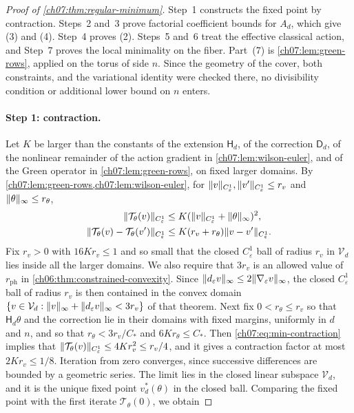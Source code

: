 \begin{proof}[Proof of \cref{ch07:thm:regular-minimum}]
Step~1 constructs the fixed point by contraction. Steps~2 and~3 prove factorial coefficient bounds for $A_d$, which give (3) and (4). Step~4 proves (2). Steps~5 and~6 treat the effective classical action, and Step~7 proves the local minimality on the fiber. Part~(7) is \cref{ch07:lem:green-rows}, applied on the torus of side $n$. Since the geometry of the cover, both constraints, and the variational identity were checked there, no divisibility condition or additional lower bound on $n$ enters.

\paragraph{Step 1: contraction.}
Let $K$ be larger than the constants of the extension $\mathsf H_d$, of the correction $\mathsf D_d$, of the nonlinear remainder of the action gradient in \cref{ch07:lem:wilson-euler}, and of the Green operator in \cref{ch07:lem:green-rows}, on fixed larger domains. By \cref{ch07:lem:green-rows,ch07:lem:wilson-euler}, for $\lVert v\rVert_{C^1_\varepsilon},\lVert v'\rVert_{C^1_\varepsilon}\le r_v$ and $\lVert \theta\rVert_\infty\le r_\theta$,
\begin{equation}\label{ch07:eq:min-contraction}
 \begin{aligned}
 \lVert \mathcal T_\theta(v)\rVert_{C^1_\varepsilon}&\le K(\lVert v\rVert_{C^1_\varepsilon}+\lVert \theta\rVert_\infty)^2,\\
 \lVert \mathcal T_\theta(v)-\mathcal T_\theta(v')\rVert_{C^1_\varepsilon}&\le K(r_v+r_\theta)\lVert v-v'\rVert_{C^1_\varepsilon}.
 \end{aligned}
\end{equation}
Fix $r_v>0$ with $16Kr_v\le1$ and so small that the closed $C^1_\varepsilon$ ball of radius $r_v$ in $\mathcal V_d$ lies inside all the larger domains. We also require that $3r_v$ is an allowed value of $r_{\mathrm{ph}}$ in \cref{ch06:thm:constrained-convexity}. Since $\lVert d_\varepsilon v\rVert_\infty\le2\lVert \nabla_\varepsilon v\rVert_\infty$, the closed $C^1_\varepsilon$ ball of radius $r_v$ is then contained in the convex domain $\{v\in\mathcal V_d:\lVert v\rVert_\infty+\lVert d_\varepsilon v\rVert_\infty<3r_v\}$ of that theorem. Next fix $0<r_\theta\le r_v$ so that $\mathsf H_d\theta$ and the correction lie in their domains with fixed margins, uniformly in $d$ and $n$, and so that $r_\theta<3r_v/C_*$ and $6Kr_\theta\le C_*$. Then \eqref{ch07:eq:min-contraction} implies that $\lVert \mathcal T_\theta(v)\rVert_{C^1_\varepsilon}\le4Kr_v^2\le r_v/4$, and it gives a contraction factor at most $2Kr_v\le1/8$. Iteration from zero converges, since successive differences are bounded by a geometric series. The limit lies in the closed linear subspace $\mathcal V_d$, and it is the unique fixed point $v_d^*(\theta)$ in the closed ball. Comparing the fixed point with the first iterate $\mathcal T_\theta(0)$, we obtain

\end{proof}
